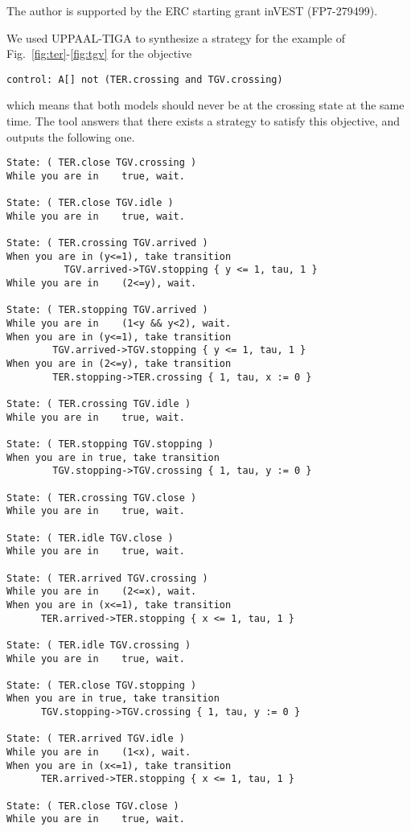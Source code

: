 \documentclass{article}
\begin{document}
The author is supported by the ERC starting grant inVEST (FP7-279499).



 
\appendix
We used UPPAAL-TIGA to synthesize a strategy for the example of
Fig.~\ref{fig:ter}-\ref{fig:tgv} for the objective
{\small
\begin{verbatim}
control: A[] not (TER.crossing and TGV.crossing)
\end{verbatim}
}
\noindent which means that both models should never be at the crossing state at the same
time.
The tool answers that there exists a strategy to satisfy this objective, and
outputs the following one.
\scriptsize
\begin{verbatim}
State: ( TER.close TGV.crossing ) 
While you are in	true, wait.

State: ( TER.close TGV.idle ) 
While you are in	true, wait.

State: ( TER.crossing TGV.arrived ) 
When you are in (y<=1), take transition 
          TGV.arrived->TGV.stopping { y <= 1, tau, 1 }
While you are in	(2<=y), wait.

State: ( TER.stopping TGV.arrived ) 
While you are in	(1<y && y<2), wait.
When you are in (y<=1), take transition 
        TGV.arrived->TGV.stopping { y <= 1, tau, 1 }
When you are in (2<=y), take transition 
        TER.stopping->TER.crossing { 1, tau, x := 0 }

State: ( TER.crossing TGV.idle ) 
While you are in	true, wait.

State: ( TER.stopping TGV.stopping ) 
When you are in true, take transition 
        TGV.stopping->TGV.crossing { 1, tau, y := 0 }

State: ( TER.crossing TGV.close ) 
While you are in	true, wait.

State: ( TER.idle TGV.close ) 
While you are in	true, wait.

State: ( TER.arrived TGV.crossing ) 
While you are in	(2<=x), wait.
When you are in (x<=1), take transition 
      TER.arrived->TER.stopping { x <= 1, tau, 1 }

State: ( TER.idle TGV.crossing ) 
While you are in	true, wait.

State: ( TER.close TGV.stopping ) 
When you are in true, take transition 
      TGV.stopping->TGV.crossing { 1, tau, y := 0 }

State: ( TER.arrived TGV.idle ) 
While you are in	(1<x), wait.
When you are in (x<=1), take transition 
      TER.arrived->TER.stopping { x <= 1, tau, 1 }

State: ( TER.close TGV.close ) 
While you are in	true, wait.


\end{verbatim}
\end{document}
